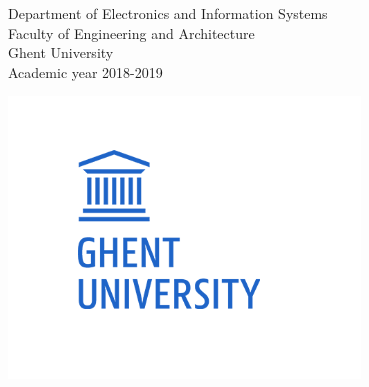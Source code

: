 \hspace{-\parindent}\begin{minipage}{0.7\textwidth}
  \hspace{-\parindent}Department of Electronics and Information Systems\\
  \hspace{-\parindent}Faculty of Engineering and Architecture\\
  \hspace{-\parindent}Ghent University\\
  \hspace{-\parindent}Academic year 2018-2019
\end{minipage}
\begin{minipage}{0.3\textwidth}
  \begin{flushright}
    \includegraphics[width=0.7\textwidth]{./figures/logo-ugent}
  \end{flushright}
\end{minipage}


